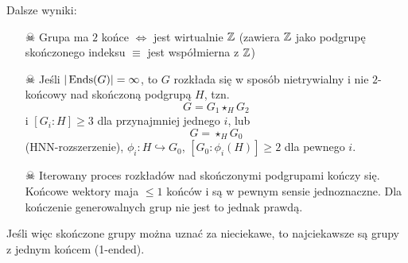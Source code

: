 Dalsze wyniki:
\begin{enumerate}
  \item[$\skull$] Grupa ma $2$ końce $\iff$ jest wirtualnie $\mathbb{Z}$ (zawiera $\mathbb{Z}$ jako podgrupę skończonego indeksu $\equiv$ jest współmierna z $\mathbb{Z}$)
  \item[$\skull$] Jeśli $|\operatorname{Ends}(G)|=\infty$, to $G$ rozkłada się w sposób  nietrywialny i nie $2$-końcowy nad skończoną podgrupą $H$, tzn. 
    $$G=G_1\star_H G_2$$
    i $[G_i:H]\geq 3$ dla przynajmniej jednego $i$, lub 
    $$G=\star_H G_0$$
    (HNN-rozszerzenie), $\phi_i:H\hookrightarrow G_0$, $[G_0:\phi_i(H)]\geq 2$ dla pewnego $i$.
  \item[$\skull$] Iterowany proces rozkładów nad skończonymi podgrupami kończy się. Końcowe wektory maja $\leq 1$ końców i są w pewnym sensie jednoznaczne. Dla kończenie generowalnych grup nie jest to jednak prawdą.
\end{enumerate}

Jeśli więc skończone grupy można uznać za nieciekawe, to najciekawsze są grupy z jednym końcem (1-ended).


